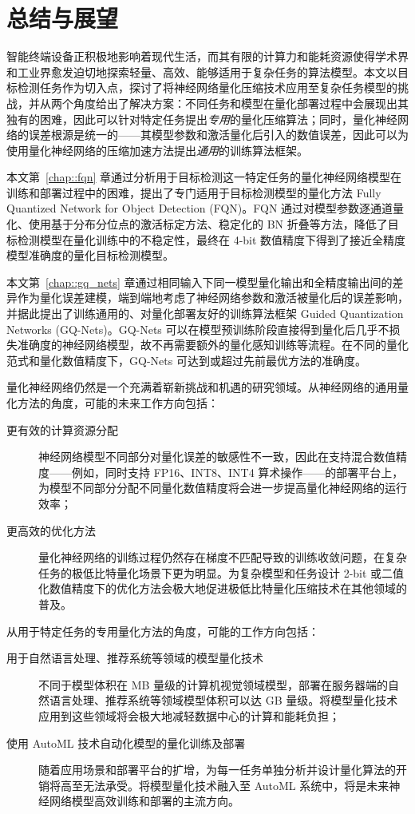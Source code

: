 \documentclass[
]{shtthesis}
\begin{document}
\chapter{总结与展望}
智能终端设备正积极地影响着现代生活，而其有限的计算力和能耗资源使得学术界和工业界愈发迫切地探索轻量、高效、能够适用于复杂任务的算法模型。本文以目标检测任务作为切入点，探讨了将神经网络量化压缩技术应用至复杂任务模型的挑战，并从两个角度给出了解决方案：不同任务和模型在量化部署过程中会展现出其独有的困难，因此可以针对特定任务提出\emph{专用}的量化压缩算法；同时，量化神经网络的误差根源是统一的——其模型参数和激活量化后引入的数值误差，因此可以为使用量化神经网络的压缩加速方法提出\emph{通用}的训练算法框架。

本文第~\ref{chap::fqn} 章通过分析用于目标检测这一特定任务的量化神经网络模型在训练和部署过程中的困难，提出了专门适用于目标检测模型的量化方法 Fully Quantized Network for Object Detection (FQN)。FQN 通过对模型参数逐通道量化、使用基于分布分位点的激活标定方法、稳定化的 BN 折叠等方法，降低了目标检测模型在量化训练中的不稳定性，最终在 4-bit 数值精度下得到了接近全精度模型准确度的量化目标检测模型。

本文第~\ref{chap::gq_nets} 章通过相同输入下同一模型量化输出和全精度输出间的差异作为量化误差建模，端到端地考虑了神经网络参数和激活被量化后的误差影响，并据此提出了训练通用的、对量化部署友好的训练算法框架 Guided Quantization Networks (GQ-Nets)。GQ-Nets 可以在模型预训练阶段直接得到量化后几乎不损失准确度的神经网络模型，故不再需要额外的量化感知训练等流程。在不同的量化范式和量化数值精度下，GQ-Nets 可达到或超过先前最优方法的准确度。

量化神经网络仍然是一个充满着崭新挑战和机遇的研究领域。从神经网络的通用量化方法的角度，可能的未来工作方向包括：
\begin{description}
  \item[更有效的计算资源分配] 神经网络模型不同部分对量化误差的敏感性不一致，因此在支持混合数值精度——例如，同时支持 FP16、INT8、INT4 算术操作——的部署平台上，为模型不同部分分配不同量化数值精度将会进一步提高量化神经网络的运行效率；
  \item[更高效的优化方法] 量化神经网络的训练过程仍然存在梯度不匹配导致的训练收敛问题，在复杂任务的极低比特量化场景下更为明显。为复杂模型和任务设计 2-bit 或二值化数值精度下的优化方法会极大地促进极低比特量化压缩技术在其他领域的普及。
\end{description}

从用于特定任务的专用量化方法的角度，可能的工作方向包括：
\begin{description}
  \item[用于自然语言处理、推荐系统等领域的模型量化技术] 不同于模型体积在 MB 量级的计算机视觉领域模型，部署在服务器端的自然语言处理、推荐系统等领域模型体积可以达 GB 量级。将模型量化技术应用到这些领域将会极大地减轻数据中心的计算和能耗负担；
  \item[使用 AutoML 技术自动化模型的量化训练及部署] 随着应用场景和部署平台的扩增，为每一任务单独分析并设计量化算法的开销将高至无法承受。将模型量化技术融入至 AutoML 系统中，将是未来神经网络模型高效训练和部署的主流方向。
\end{description}
\end{document}
